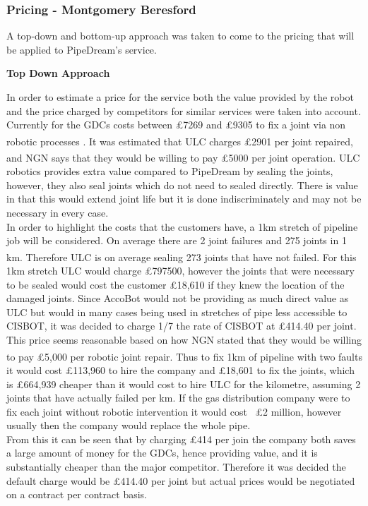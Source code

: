 \documentclass[11pt]{article}		%
\newcommand{\supercite}[1]{\textsuperscript{\cite{#1}}}		%
\begin{document}
            \subsubsection[Pricing]{Pricing - Montgomery Beresford} \label{revenue_model}
                    
                    A top-down and bottom-up approach was taken to come to the pricing that will be applied to PipeDream's service.
                    
                        
                    	\textbf{Top Down Approach}
                    	
            	            In order to estimate a price for the service both the value provided by the robot and the price charged by competitors for similar services were taken into account. Currently for the GDCs costs between £7269 and £9305 to fix a joint via non robotic processes \supercite{NYT}. It was estimated that ULC charges £2901 per joint repaired,\supercite{NYT} and NGN says that they would be willing to pay £5000 per joint operation. \supercite{NGN} 
            	            ULC robotics provides extra value compared to PipeDream by sealing the joints, however, they also seal joints which do not need to sealed directly. There is value in that this would extend joint life but it is done indiscriminately and may not be necessary in every case.
            	            \\
            	            In order to highlight the costs that the customers have, a 1km stretch of pipeline job will be considered. On average there are 2 joint failures and 275 joints in 1 km. \supercite{SGN_Southern} Therefore ULC is on average sealing 273 joints that have not failed. For this 1km stretch ULC would charge £797500, however the joints that were necessary to be sealed would cost the customer £18,610 if they knew the location of the damaged joints. Since AccoBot would not be providing as much direct value as ULC but would in many cases being used in stretches of pipe less accessible to CISBOT, it was decided to charge 1/7 the rate of CISBOT at £414.40 per joint. This price seems reasonable based on how NGN stated that they would be willing to pay £5,000 per robotic joint repair.\supercite{NGN} Thus to fix 1km of pipeline with two faults it would cost £113,960 to hire the company and £18,601 to fix the joints, which is £664,939 cheaper than it would cost to hire ULC for the kilometre, assuming 2 joints that have actually failed per km. If the gas distribution company were to fix each joint without robotic intervention it would cost ~£2 million, however usually then the company would replace the whole pipe.
            	            \\
            	            From this it can be seen that by charging £414 per join the company both saves a large amount of money for the GDCs, hence providing value, and it is substantially cheaper than the major competitor. Therefore it was decided the default charge would be £414.40 per joint but actual prices would be negotiated on a contract per contract basis.
            
\end{document}
